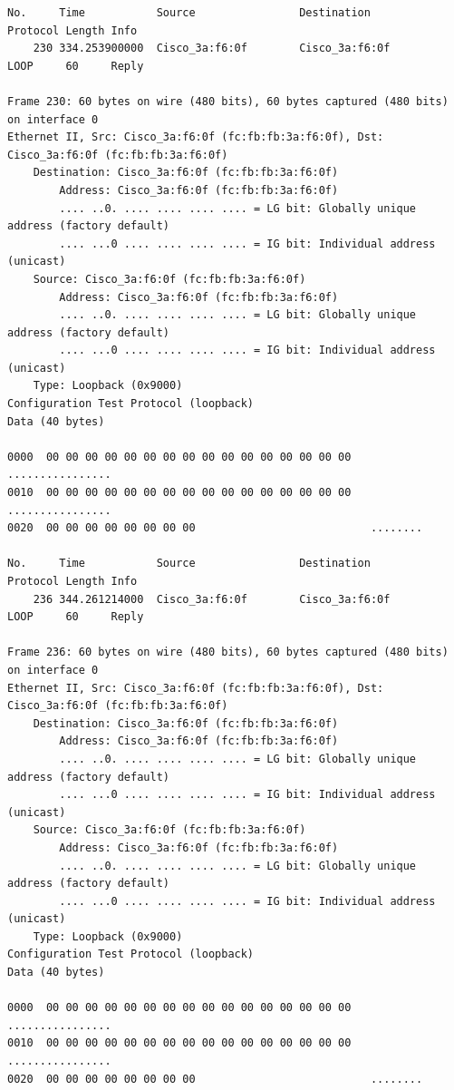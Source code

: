 \documentclass[a4paper,11pt]{article}
\begin{document}
\begin{lstlisting}
No.     Time           Source                Destination           Protocol Length Info
    230 334.253900000  Cisco_3a:f6:0f        Cisco_3a:f6:0f        LOOP     60     Reply

Frame 230: 60 bytes on wire (480 bits), 60 bytes captured (480 bits) on interface 0
Ethernet II, Src: Cisco_3a:f6:0f (fc:fb:fb:3a:f6:0f), Dst: Cisco_3a:f6:0f (fc:fb:fb:3a:f6:0f)
    Destination: Cisco_3a:f6:0f (fc:fb:fb:3a:f6:0f)
        Address: Cisco_3a:f6:0f (fc:fb:fb:3a:f6:0f)
        .... ..0. .... .... .... .... = LG bit: Globally unique address (factory default)
        .... ...0 .... .... .... .... = IG bit: Individual address (unicast)
    Source: Cisco_3a:f6:0f (fc:fb:fb:3a:f6:0f)
        Address: Cisco_3a:f6:0f (fc:fb:fb:3a:f6:0f)
        .... ..0. .... .... .... .... = LG bit: Globally unique address (factory default)
        .... ...0 .... .... .... .... = IG bit: Individual address (unicast)
    Type: Loopback (0x9000)
Configuration Test Protocol (loopback)
Data (40 bytes)

0000  00 00 00 00 00 00 00 00 00 00 00 00 00 00 00 00   ................
0010  00 00 00 00 00 00 00 00 00 00 00 00 00 00 00 00   ................
0020  00 00 00 00 00 00 00 00                           ........

No.     Time           Source                Destination           Protocol Length Info
    236 344.261214000  Cisco_3a:f6:0f        Cisco_3a:f6:0f        LOOP     60     Reply

Frame 236: 60 bytes on wire (480 bits), 60 bytes captured (480 bits) on interface 0
Ethernet II, Src: Cisco_3a:f6:0f (fc:fb:fb:3a:f6:0f), Dst: Cisco_3a:f6:0f (fc:fb:fb:3a:f6:0f)
    Destination: Cisco_3a:f6:0f (fc:fb:fb:3a:f6:0f)
        Address: Cisco_3a:f6:0f (fc:fb:fb:3a:f6:0f)
        .... ..0. .... .... .... .... = LG bit: Globally unique address (factory default)
        .... ...0 .... .... .... .... = IG bit: Individual address (unicast)
    Source: Cisco_3a:f6:0f (fc:fb:fb:3a:f6:0f)
        Address: Cisco_3a:f6:0f (fc:fb:fb:3a:f6:0f)
        .... ..0. .... .... .... .... = LG bit: Globally unique address (factory default)
        .... ...0 .... .... .... .... = IG bit: Individual address (unicast)
    Type: Loopback (0x9000)
Configuration Test Protocol (loopback)
Data (40 bytes)

0000  00 00 00 00 00 00 00 00 00 00 00 00 00 00 00 00   ................
0010  00 00 00 00 00 00 00 00 00 00 00 00 00 00 00 00   ................
0020  00 00 00 00 00 00 00 00                           ........


\end{lstlisting}
\end{document}
